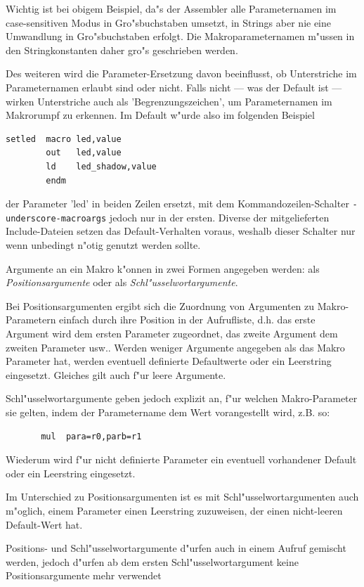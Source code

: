 \documentclass[12pt,a4paper,twoside]{report}
\newcommand{\tty}[1]{{\tt #1}}
\begin{document}
Wichtig ist bei obigem Beispiel, da"s der Assembler alle
Parameternamen im case-sensitiven Modus in Gro"sbuchstaben
umsetzt, in Strings aber nie eine Umwandlung in Gro"sbuchstaben
erfolgt. Die Makroparameternamen m"ussen in den Stringkonstanten
daher gro"s geschrieben werden.
\par
Des weiteren wird die Parameter-Ersetzung davon beeinflusst, ob
Unterstriche im Parameternamen erlaubt sind oder nicht.  Falls
nicht --- was der Default ist --- wirken Unterstriche auch
als 'Begrenzungszeichen', um Parameternamen im Makrorumpf zu
erkennen.  Im Default w"urde also im folgenden Beispiel
\begin{verbatim}
setled  macro led,value
        out   led,value
        ld    led_shadow,value
        endm
\end{verbatim}
der Parameter 'led' in beiden Zeilen ersetzt, mit dem Kommandozeilen-Schalter
\tty{-underscore-macroargs} jedoch nur in der ersten.  Diverse
der mitgelieferten Include-Dateien setzen das Default-Verhalten
voraus, weshalb dieser Schalter nur wenn unbedingt n"otig genutzt
werden sollte.
\par
Argumente an ein Makro k"onnen in zwei Formen angegeben werden:
als {\em Positionsargumente} oder als {\em
Schl"usselwortargumente}.
\par
Bei Positionsargumenten ergibt sich
die Zuordnung von Argumenten zu Makro-Parametern einfach durch
ihre Position in der Aufrufliste, d.h. das erste Argument wird dem
ersten Parameter zugeordnet, das zweite Argument dem zweiten
Parameter usw..  Werden weniger Argumente angegeben als das Makro
Parameter hat, werden eventuell definierte Defaultwerte oder ein
Leerstring eingesetzt.  Gleiches gilt auch f"ur leere Argumente.
\par
Schl"usselwortargumente geben jedoch explizit an, f"ur welchen
Makro-Parameter sie gelten, indem der Parametername dem Wert
vorangestellt wird, z.B. so:
\begin{verbatim}
       mul  para=r0,parb=r1
\end{verbatim}
Wiederum wird f"ur nicht definierte Parameter ein eventuell
vorhandener Default oder ein Leerstring eingesetzt.
\par
Im Unterschied zu Positionsargumenten ist es mit
Schl"usselwortargumenten auch m"oglich, einem Parameter einen
Leerstring zuzuweisen, der einen nicht-leeren Default-Wert hat.
\par
Positions- und Schl"usselwortargumente d"urfen auch in einem
Aufruf gemischt werden, jedoch d"urfen ab dem ersten
Schl"usselwortargument keine Positionsargumente mehr verwendet
\end{document}
